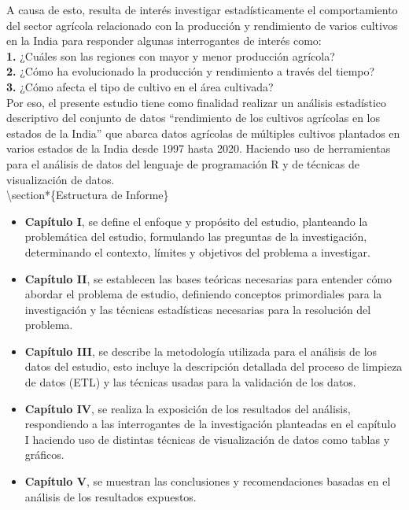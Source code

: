 \documentclass[oneside,11pt]{Latex/Classes/PhDthesisPSnPDF}
\begin{document}
A causa de esto, resulta de interés investigar estadísticamente el
comportamiento del sector agrícola relacionado con la producción y
rendimiento de varios cultivos en la India para responder algunas
interrogantes de interés como:\\

\textbf{1.} ¿Cuáles son las regiones con mayor y menor producción
agrícola?\\

\textbf{2.} ¿Cómo ha evolucionado la producción y rendimiento a través
del tiempo?\\

\textbf{3.} ¿Cómo afecta el tipo de cultivo en el área cultivada?\\

Por eso, el presente estudio tiene como finalidad realizar un análisis
estadístico descriptivo del conjunto de datos ``rendimiento de los
cultivos agrícolas en los estados de la India'' que abarca datos
agrícolas de múltiples cultivos plantados en varios estados de la India
desde 1997 hasta 2020. Haciendo uso de herramientas para el análisis de
datos del lenguaje de programación R y de técnicas de visualización de
datos.\\

\textbackslash section*\{Estructura de Informe\}

\begin{itemize}

    \item \textbf{Capítulo I}, se define el enfoque y propósito del estudio, planteando la problemática del estudio, formulando las preguntas de la investigación, determinando el contexto, límites y objetivos del problema a investigar.
    
    \item \textbf{Capítulo II}, se establecen las bases teóricas necesarias para entender cómo abordar el problema de estudio, definiendo conceptos primordiales para la investigación y las técnicas estadísticas necesarias para la resolución del problema.
    
    \item \textbf{Capítulo III}, se describe la metodología utilizada para el análisis de los datos del estudio, esto incluye la descripción detallada del proceso de limpieza de datos (ETL) y las técnicas usadas para la validación de los datos.
    
    \item \textbf{Capítulo IV}, se realiza la exposición de los resultados del análisis, respondiendo a las interrogantes de la investigación planteadas en el capítulo I haciendo uso de distintas técnicas de visualización  de datos como tablas y gráficos.
    
    \item \textbf{Capítulo V}, se muestran las conclusiones y recomendaciones basadas en el análisis de los resultados expuestos.
    
\end{itemize}
\end{document}

